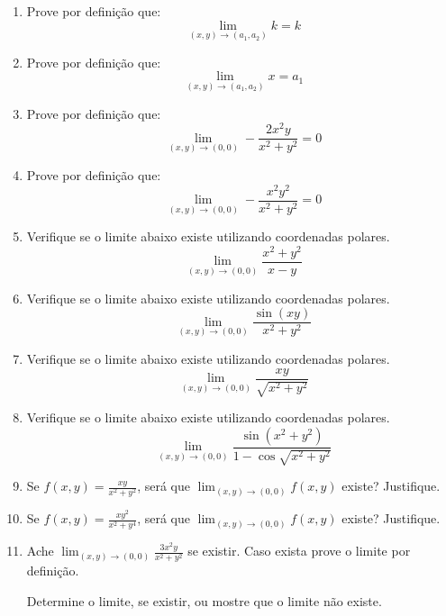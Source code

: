 \documentclass[11pt,a4paper]{article}
\newcommand{\limite}{\displaystyle\lim}
\begin{document}
\begin{enumerate}
	\item Prove por definição que:
	$$\limite_{(x,y) \to (a_1, a_2)} k = k$$
		
	\item Prove por definição que:
	$$\limite_{(x,y) \to (a_1, a_2)} x = a_1$$
	
	\item Prove por definição que:
	$$\limite_{(x,y) \to (0,0)} - \displaystyle\frac{2x^2y}{x^2 + y^2} = 0$$
	
	\item Prove por definição que:
	$$\limite_{(x,y) \to (0,0)} - \displaystyle\frac{x^2y^2}{x^2 + y^2} = 0$$
	\item Verifique se o limite abaixo existe utilizando coordenadas polares.
	$$\limite_{(x,y) \to (0,0)} \displaystyle\frac{x^2 + y^2}{x - y}$$
	\item Verifique se o limite abaixo existe utilizando coordenadas polares.
	$$\limite_{(x,y) \to (0,0)} \displaystyle\frac{\sin (xy)}{x^2 + y^2}$$
	
	\item Verifique se o limite abaixo existe utilizando coordenadas polares.
	$$\limite_{(x,y) \to (0,0)} \displaystyle\frac{xy}{\sqrt{x^2 + y^2}}$$
	\item Verifique se o limite abaixo existe utilizando coordenadas polares.
	$$\limite_{(x,y) \to (0,0)} \displaystyle\frac{\sin (x^2 + y^2)}{1 - \cos \sqrt{x^2 + y^2}}$$
	
	\item Se $f(x,y) = \displaystyle\frac{xy}{x^2 + y^2}$, será que $\limite_{(x,y) \to (0,0)} f(x,y)$ existe? Justifique.
	
	\item Se $f(x,y) = \displaystyle\frac{xy^2}{x^2 + y^4}$, será que $\limite_{(x,y) \to (0,0)} f(x,y)$ existe? Justifique.
	
	\item Ache $\limite_{(x,y) \to (0,0)} \displaystyle\frac{3x^2y}{x^2 + y^2}$ se existir. Caso exista prove o limite por definição.
	
Determine o limite, se existir, ou mostre que o limite não existe.
	

\end{enumerate}
\end{document}
